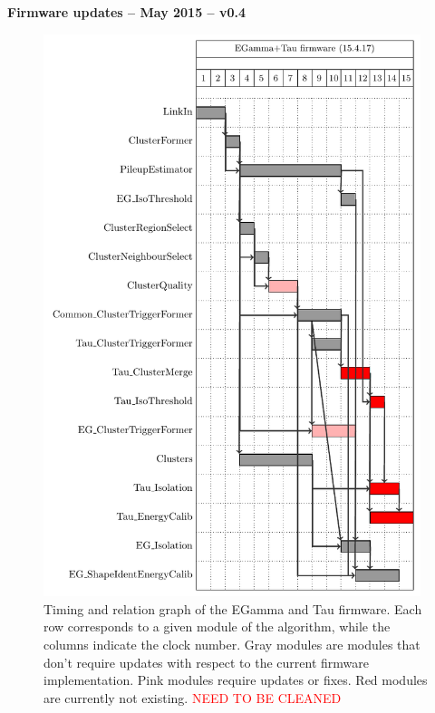 \documentclass[a4paper, 12pt]{article}
\begin{document}
\renewcommand{\contentsname}{}


\begin{center}
{\LARGE \bf Firmware updates -- May 2015 -- v0.4}\\
\end{center}


\begin{figure}[hbtp]
  \begin{center}
    \includegraphics[width=11cm]{./gantt_charts/firmware_egAndTau_mod.pdf}
    \caption{Timing and relation graph of the EGamma and Tau firmware. Each row corresponds to a given module of the algorithm, while the columns indicate the clock number. Gray modules are modules that don't require updates with respect to the current firmware implementation. Pink modules require updates or fixes. Red modules are currently not existing. \textcolor{red}{NEED TO BE CLEANED}}
    \label{fig:gantt}
  \end{center}
\end{figure}
\end{document}
